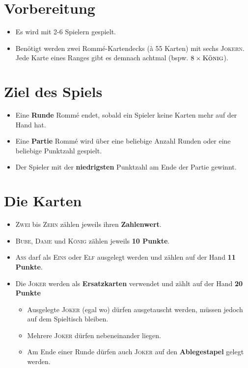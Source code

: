 \documentclass[a4paper,12pt,twoside]{article}
\begin{document}
\section{Vorbereitung}

\begin{itemize}
    \item Es wird mit 2-6 Spielern gespielt.
    \item Benötigt werden zwei Rommé-Kartendecks (à 55 Karten) mit sechs \textsc{Jokern}. Jede Karte eines Ranges gibt es demnach achtmal (bspw. $8\times\textsc{König}$).
\end{itemize}



\section{Ziel des Spiels}

\begin{itemize}
    \item Eine \textbf{Runde} Rommé endet, sobald ein Spieler keine Karten mehr auf der Hand hat.
    \item Eine \textbf{Partie} Rommé wird über eine beliebige Anzahl Runden oder eine beliebige Punktzahl gespielt.
    \item Der Spieler mit der \textbf{niedrigsten} Punktzahl am Ende der Partie gewinnt.
\end{itemize}



\section{Die Karten}

\begin{itemize}
    \item \textsc{Zwei} bis \textsc{Zehn} zählen jeweils ihren \textbf{Zahlenwert}.
    \item \textsc{Bube}, \textsc{Dame} und \textsc{König} zählen jeweils \textbf{10 Punkte}.
    \item \textsc{Ass} darf als \textsc{Eins} oder \textsc{Elf} ausgelegt werden und zählen auf der Hand \textbf{11 Punkte}.
    \item Die \textsc{Joker} werden als \textbf{Ersatzkarten} verwendet und zählt auf der Hand \textbf{20 Punkte}
    \begin{itemize}
        \item Ausgelegte \textsc{Joker} (egal wo) dürfen ausgetauscht werden, müssen jedoch auf dem Spieltisch bleiben.
        \item Mehrere \textsc{Joker} dürfen nebeneinander liegen.
        \item Am Ende einer Runde dürfen auch \textsc{Joker} auf den \textbf{Ablegestapel} gelegt werden.
    \end{itemize}
\end{itemize}
\end{document}
